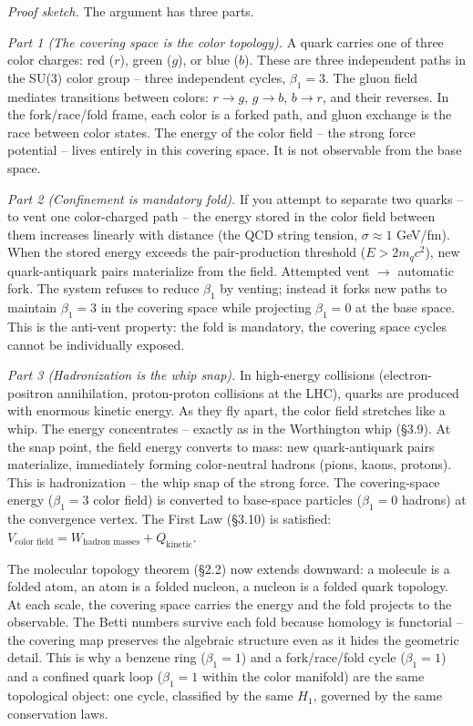 \documentclass[
  11pt,
]{article}
\begin{document}
\emph{Proof sketch.} The argument has three parts.

\emph{Part 1 (The covering space is the color topology).} A quark
carries one of three color charges: red (\(r\)), green (\(g\)), or blue
(\(b\)). These are three independent paths in the SU(3) color group --
three independent cycles, \(\beta_1 = 3\). The gluon field mediates
transitions between colors: \(r \to g\), \(g \to b\), \(b \to r\), and
their reverses. In the fork/race/fold frame, each color is a forked
path, and gluon exchange is the race between color states. The energy of
the color field -- the strong force potential -- lives entirely in this
covering space. It is not observable from the base space.

\emph{Part 2 (Confinement is mandatory fold).} If you attempt to
separate two quarks -- to vent one color-charged path -- the energy
stored in the color field between them increases linearly with distance
(the QCD string tension, \(\sigma \approx 1\) GeV/fm). When the stored
energy exceeds the pair-production threshold (\(E > 2m_q c^2\)), new
quark-antiquark pairs materialize from the field. Attempted vent \(\to\)
automatic fork. The system refuses to reduce \(\beta_1\) by venting;
instead it forks new paths to maintain \(\beta_1 = 3\) in the covering
space while projecting \(\beta_1 = 0\) at the base space. This is the
anti-vent property: the fold is mandatory, the covering space cycles
cannot be individually exposed.

\emph{Part 3 (Hadronization is the whip snap).} In high-energy
collisions (electron-positron annihilation, proton-proton collisions at
the LHC), quarks are produced with enormous kinetic energy. As they fly
apart, the color field stretches like a whip. The energy concentrates --
exactly as in the Worthington whip (§3.9). At the snap point, the field
energy converts to mass: new quark-antiquark pairs materialize,
immediately forming color-neutral hadrons (pions, kaons, protons). This
is hadronization -- the whip snap of the strong force. The
covering-space energy (\(\beta_1 = 3\) color field) is converted to
base-space particles (\(\beta_1 = 0\) hadrons) at the convergence
vertex. The First Law (§3.10) is satisfied:
\(V_{\text{color field}} = W_{\text{hadron masses}} + Q_{\text{kinetic}}\).

The molecular topology theorem (§2.2) now extends downward: a molecule
is a folded atom, an atom is a folded nucleon, a nucleon is a folded
quark topology. At each scale, the covering space carries the energy and
the fold projects to the observable. The Betti numbers survive each fold
because homology is functorial -- the covering map preserves the
algebraic structure even as it hides the geometric detail. This is why a
benzene ring (\(\beta_1 = 1\)) and a fork/race/fold cycle
(\(\beta_1 = 1\)) and a confined quark loop (\(\beta_1 = 1\) within the
color manifold) are the same topological object: one cycle, classified
by the same \(H_1\), governed by the same conservation laws.
\end{document}
